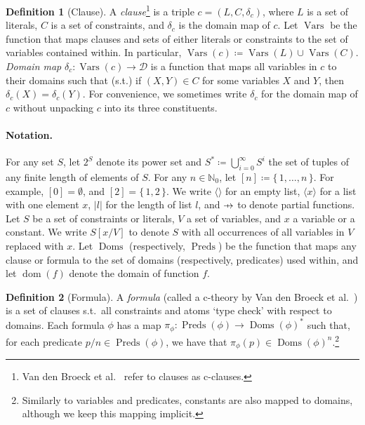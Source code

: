 \documentclass{article}
\theoremstyle{definition}
\newtheorem{definition}{Definition}
\newcommand\pfun{\mathrel{\ooalign{\hfil$\mapstochar\mkern5mu$\hfil\cr$\to$\cr}}}
\DeclareMathOperator{\dom}{dom}
\DeclareMathOperator{\Doms}{Doms}
\DeclareMathOperator{\Vars}{Vars}
\DeclareMathOperator{\Preds}{Preds}
\begin{document}
\begin{definition}[Clause]\label{def:clause}
  A \emph{clause}\footnote{Van den Broeck et
    al.~ refer to clauses as c-clauses.}
  is a triple $c = (L, C, \delta_c)$, where $L$ is a set of literals, $C$ is a
  set of constraints, and $\delta_c$ is the domain map of $c$. Let $\Vars$ be
  the function that maps clauses and sets of either literals or constraints to
  the set of variables contained within. In particular,
  $\Vars(c) \coloneqq \Vars(L) \cup \Vars(C)$. \emph{Domain map}
  $\delta_{c}\colon \Vars(c) \to \mathcal{D}$ is a function that maps all
  variables in $c$ to their domains such that (s.t.) if $(X, Y) \in C$ for some
  variables $X$ and $Y$, then $\delta_c(X) = \delta_c(Y)$. For convenience, we
  sometimes write $\delta_c$ for the domain map of $c$ without unpacking $c$
  into its three constituents.
\end{definition}

\paragraph{Notation.}
For any set $S$, let $2^{S}$ denote its power set and
$S^{\ast} \coloneqq \bigcup_{i=0}^{\infty} S^{i}$ the set of tuples of any
finite length of elements of $S$. For any $n \in \mathbb{N}_{0}$, let
$[n] \coloneqq \{\, 1, \dots, n \,\}$. For example, $[0] = \emptyset$, and
$[2] = \{\, 1, 2 \,\}$. We write $\langle\rangle$ for an empty list,
$\langle x \rangle$ for a list with one element $x$, $|l|$ for the length of
list $l$, and $\pfun$ to denote partial functions. Let $S$ be a set of
constraints or literals, $V$ a set of variables, and $x$ a variable or a
constant. We write $S[x/V]$ to denote $S$ with all occurrences of all variables
in $V$ replaced with $x$. Let $\Doms$ (respectively, $\Preds$) be the function
that maps any clause or formula to the set of domains (respectively, predicates)
used within, and let $\dom(f)$ denote the domain of function $f$.

\begin{definition}[Formula]\label{def:formula}
  A \emph{formula} (called a c-theory by Van den Broeck et
  al.~) is a set of clauses s.t.\ all
  constraints and atoms `type check' with respect to domains. Each formula
  $\phi$ has a map $\pi_{\phi}\colon \Preds(\phi) \to {\Doms(\phi)}^{\ast}$ such
  that, for each predicate $p/n \in \Preds(\phi)$, we have that
  $\pi_{\phi}(p) \in {\Doms(\phi)}^{n}$.\footnote{Similarly to variables and
    predicates, constants are also mapped to domains, although we keep this
    mapping implicit.}
\end{definition}
\end{document}
